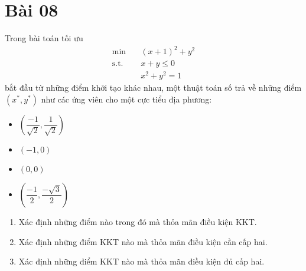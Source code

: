 \section{Bài 08}
Trong bài toán tối ưu
\begin{equation}
    \begin{aligned}
        \min \quad & (x+1)^2 + y^2\\
        \textrm{s.t.} \quad & x + y \leq 0\\
        &x^2 + y^2 = 1
    \end{aligned}
\end{equation}
bắt đầu từ những điểm khởi tạo khác nhau, một thuật toán số trả về những điểm $(x^{*}, y^{*})$ như các ứng viên cho một cực tiểu địa phương:
\begin{itemize}
    \item $\left(\dfrac{-1}{\sqrt{2}}, \dfrac{1}{\sqrt{2}}\right)$
    \item $(-1, 0)$
    \item $(0, 0)$
    \item $\left(\dfrac{-1}{{2}}, \dfrac{-\sqrt{3}}{{2}}\right)$
\end{itemize}
\begin{enumerate}[label=(\alph*)]
    \item Xác định những điểm nào trong đó mà thỏa mãn điều kiện KKT.
    \item Xác định những điểm KKT nào mà thỏa mãn điều kiện cần cấp hai.
    \item Xác định những điểm KKT nào mà thỏa mãn điều kiện đủ cấp hai.
\end{enumerate}

